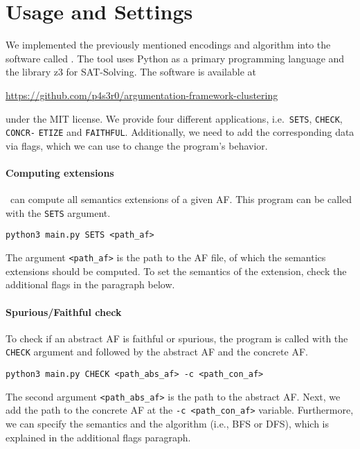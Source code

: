 \section{Usage and Settings}
\label{sec:ImplementationUsageAndSettings}
We implemented the previously mentioned encodings and algorithm into the software called \prog. The tool uses Python as a primary programming language and the library z3 for SAT-Solving. The software is available at

\begin{center}
    \url{https://github.com/p4s3r0/argumentation-framework-clustering}
\end{center}

\noindent
under the MIT license. We provide four different applications, i.e.\ \texttt{SETS}, \texttt{CHECK}, \texttt{CONCR-} \texttt{ETIZE} and \texttt{FAITHFUL}. Additionally, we need to add the corresponding data via flags, which we can use to change the program's behavior.

\paragraph{Computing extensions} \prog\ can compute all semantics extensions of a given AF. This program can be called with the \texttt{SETS} argument.

\begin{center}
    \texttt{python3 main.py SETS <path\_af>}
\end{center}

The argument \texttt{<path\_af>} is the path to the AF file, of which the semantics extensions should be computed. To set the semantics of the extension, check the additional flags in the paragraph below.

\paragraph{Spurious/Faithful check} To check if an abstract AF is faithful or spurious, the program is called with the \texttt{CHECK} argument and followed by the abstract AF and the concrete AF.

\begin{center}
    \texttt{python3 main.py CHECK <path\_abs\_af> -c <path\_con\_af>}
\end{center}

The second argument \texttt{<path\_abs\_af>} is the path to the abstract AF. Next, we add the path to the concrete AF at the \texttt{-c <path\_con\_af>} variable. Furthermore, we can specify the semantics and the algorithm (i.e., BFS or DFS), which is explained in the additional flags paragraph.



